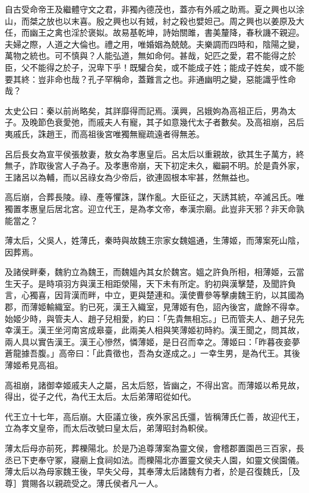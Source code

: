 
\begin{pinyinscope}
自古受命帝王及繼體守文之君，非獨內德茂也，蓋亦有外戚之助焉。夏之興也以涂山，而桀之放也以末喜。殷之興也以有娀，紂之殺也嬖妲己。周之興也以姜原及大任，而幽王之禽也淫於褒姒。故易基乾坤，詩始關雎，書美釐降，春秋譏不親迎。夫婦之際，人道之大倫也。禮之用，唯婚姻為兢兢。夫樂調而四時和，陰陽之變，萬物之統也。可不慎與？人能弘道，無如命何。甚哉，妃匹之愛，君不能得之於臣，父不能得之於子，況卑下乎！既驩合矣，或不能成子姓；能成子姓矣，或不能要其終：豈非命也哉？孔子罕稱命，蓋難言之也。非通幽明之變，惡能識乎性命哉？

太史公曰：秦以前尚略矣，其詳靡得而記焉。漢興，呂娥姁為高祖正后，男為太子。及晚節色衰愛弛，而戚夫人有寵，其子如意幾代太子者數矣。及高祖崩，呂后夷戚氏，誅趙王，而高祖後宮唯獨無寵疏遠者得無恙。

呂后長女為宣平侯張敖妻，敖女為孝惠皇后。呂太后以重親故，欲其生子萬方，終無子，詐取後宮人子為子。及孝惠帝崩，天下初定未久，繼嗣不明。於是貴外家，王諸呂以為輔，而以呂祿女為少帝后，欲連固根本牢甚，然無益也。

高后崩，合葬長陵。祿、產等懼誅，謀作亂。大臣征之，天誘其統，卒滅呂氏。唯獨置孝惠皇后居北宮。迎立代王，是為孝文帝，奉漢宗廟。此豈非天邪？非天命孰能當之？

薄太后，父吳人，姓薄氏，秦時與故魏王宗家女魏媼通，生薄姬，而薄案死山陰，因葬焉。

及諸侯畔秦，魏豹立為魏王，而魏媼內其女於魏宮。媼之許負所相，相薄姬，云當生天子。是時項羽方與漢王相距滎陽，天下未有所定。豹初與漢擊楚，及聞許負言，心獨喜，因背漢而畔，中立，更與楚連和。漢使曹參等擊虜魏王豹，以其國為郡，而薄姬輸織室。豹已死，漢王入織室，見薄姬有色，詔內後宮，歲餘不得幸。始姬少時，與管夫人、趙子兒相愛，約曰：「先貴無相忘。」已而管夫人、趙子兒先幸漢王。漢王坐河南宮成皋臺，此兩美人相與笑薄姬初時約。漢王聞之，問其故，兩人具以實告漢王。漢王心慘然，憐薄姬，是日召而幸之。薄姬曰：「昨暮夜妾夢蒼龍據吾腹。」高帝曰：「此貴徵也，吾為女遂成之。」一幸生男，是為代王。其後薄姬希見高祖。

高祖崩，諸御幸姬戚夫人之屬，呂太后怒，皆幽之，不得出宮。而薄姬以希見故，得出，從子之代，為代王太后。太后弟薄昭從如代。

代王立十七年，高后崩。大臣議立後，疾外家呂氏彊，皆稱薄氏仁善，故迎代王，立為孝文皇帝，而太后改號曰皇太后，弟薄昭封為軹侯。

薄太后母亦前死，葬櫟陽北。於是乃追尊薄案為靈文侯，會稽郡置園邑三百家，長丞已下吏奉守冢，寢廟上食祠如法。而櫟陽北亦置靈文侯夫人園，如靈文侯園儀。薄太后以為母家魏王後，早失父母，其奉薄太后諸魏有力者，於是召復魏氏，［及尊］賞賜各以親疏受之。薄氏侯者凡一人。


\end{pinyinscope}
